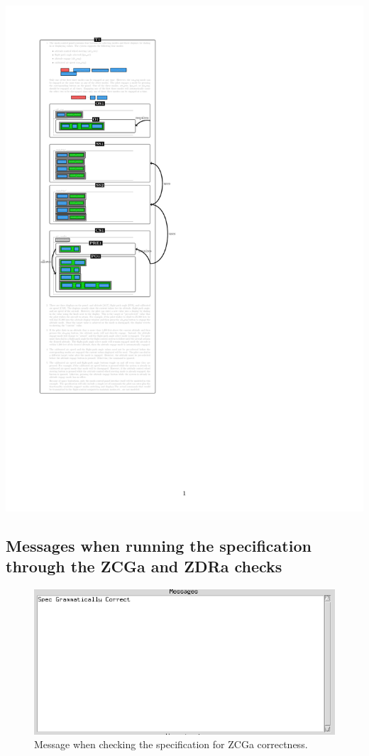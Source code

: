 %
\noindent \includegraphics[clip, trim=0cm 4cm 6cm 1.5cm]{examples/semiform/1n2.pdf}

\subsection{Messages when running the specification through the ZCGa and ZDRa checks}

\begin{figure}[H]
\includegraphics[scale=0.7]{examples/semiform/zcgacorrect.png}
\caption{Message when checking the specification for ZCGa correctness.}
\end{figure}

